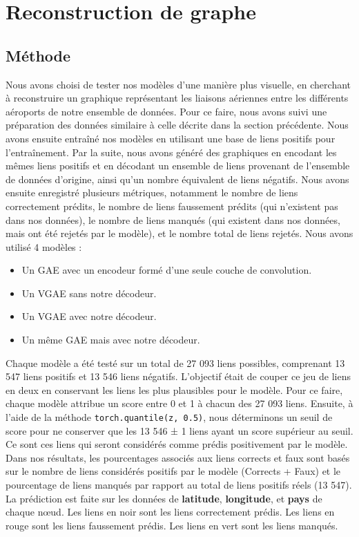 \documentclass{article}
\begin{document}
\section{Reconstruction de graphe}
\subsection{Méthode}
Nous avons choisi de tester nos modèles d'une manière plus visuelle, en cherchant à reconstruire un graphique représentant les liaisons aériennes entre les différents aéroports de notre ensemble de données. Pour ce faire, nous avons suivi une préparation des données similaire à celle décrite dans la section précédente. Nous avons ensuite entraîné nos modèles en utilisant une base de liens positifs pour l'entraînement. Par la suite, nous avons généré des graphiques en encodant les mêmes liens positifs et en décodant un ensemble de liens provenant de l'ensemble de données d'origine, ainsi qu'un nombre équivalent de liens négatifs. Nous avons ensuite enregistré plusieurs métriques, notamment le nombre de liens correctement prédits, le nombre de liens faussement prédits (qui n'existent pas dans nos données), le nombre de liens manqués (qui existent dans nos données, mais ont été rejetés par le modèle), et le nombre total de liens rejetés.
Nous avons utilisé 4 modèles :
\begin{itemize}
    \item Un GAE avec un encodeur formé d’une seule couche de convolution.
    \item Un VGAE sans notre décodeur.
    \item Un VGAE avec notre décodeur.
    \item Un même GAE mais avec notre décodeur.
\end{itemize}

Chaque modèle a été testé sur un total de 27 093 liens possibles, comprenant 13 547 liens positifs et 13 546 liens négatifs. L'objectif était de couper ce jeu de liens en deux en conservant les liens les plus plausibles pour le modèle. Pour ce faire, chaque modèle attribue un score entre 0 et 1 à chacun des 27 093 liens. Ensuite, à l'aide de la méthode \texttt{torch.quantile(z, 0.5)}, nous déterminons un seuil de score pour ne conserver que les 13 546 ± 1 liens ayant un score supérieur au seuil. Ce sont ces liens qui seront considérés comme prédis positivement par le modèle. Dans nos résultats, les pourcentages associés aux liens corrects et faux sont basés sur le nombre de liens considérés positifs par le modèle (Corrects + Faux) et le pourcentage de liens manqués par rapport au total de liens positifs réels (13 547).
La prédiction est faite sur les données de \textbf{latitude}, \textbf{longitude},  et \textbf{pays} de chaque nœud.\newline
\newline
Les liens en noir sont les liens correctement prédis.\newline
Les liens en rouge sont les liens faussement prédis.\newline
Les liens en vert sont les liens manqués.
\end{document}
